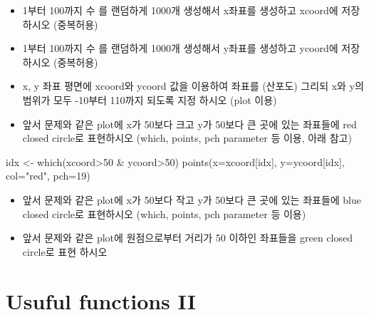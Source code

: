 \documentclass[
]{book}
\newenvironment{Shaded}{\begin{snugshade}}{\end{snugshade}}
\newcommand{\AttributeTok}[1]{\textcolor[rgb]{0.77,0.63,0.00}{#1}}
\newcommand{\DecValTok}[1]{\textcolor[rgb]{0.00,0.00,0.81}{#1}}
\newcommand{\FunctionTok}[1]{\textcolor[rgb]{0.00,0.00,0.00}{#1}}
\newcommand{\NormalTok}[1]{#1}
\newcommand{\OtherTok}[1]{\textcolor[rgb]{0.56,0.35,0.01}{#1}}
\newcommand{\SpecialCharTok}[1]{\textcolor[rgb]{0.00,0.00,0.00}{#1}}
\newcommand{\StringTok}[1]{\textcolor[rgb]{0.31,0.60,0.02}{#1}}
\providecommand{\tightlist}{%
  \setlength{\itemsep}{0pt}\setlength{\parskip}{0pt}}
\begin{document}
\begin{itemize}
\tightlist
\item
  1부터 100까지 수 를 랜덤하게 1000개 생성해서 x좌표를 생성하고 xcoord에 저장 하시오 (중복허용)
\item
  1부터 100까지 수 를 랜덤하게 1000개 생성해서 y좌표를 생성하고 ycoord에 저장 하시오 (중복허용)
\item
  x, y 좌표 평면에 xcoord와 ycoord 값을 이용하여 좌표를 (산포도) 그리되 x와 y의 범위가 모두 -10부터 110까지 되도록 지정 하시오 (plot 이용)
\item
  앞서 문제와 같은 plot에 x가 50보다 크고 y가 50보다 큰 곳에 있는 좌표들에 red closed circle로 표현하시오 (which, points, pch parameter 등 이용, 아래 참고)
\end{itemize}

\begin{Shaded}
\begin{Highlighting}[]
\NormalTok{idx }\OtherTok{\textless{}{-}} \FunctionTok{which}\NormalTok{(xcoord}\SpecialCharTok{\textgreater{}}\DecValTok{50} \SpecialCharTok{\&}\NormalTok{ ycoord}\SpecialCharTok{\textgreater{}}\DecValTok{50}\NormalTok{)}
\FunctionTok{points}\NormalTok{(}\AttributeTok{x=}\NormalTok{xcoord[idx], }\AttributeTok{y=}\NormalTok{ycoord[idx], }\AttributeTok{col=}\StringTok{"red"}\NormalTok{, }\AttributeTok{pch=}\DecValTok{19}\NormalTok{)}
\end{Highlighting}
\end{Shaded}

\begin{itemize}
\tightlist
\item
  앞서 문제와 같은 plot에 x가 50보다 작고 y가 50보다 큰 곳에 있는 좌표들에 blue closed circle로 표현하시오 (which, points, pch parameter 등 이용)
\item
  앞서 문제와 같은 plot에 원점으로부터 거리가 50 이하인 좌표들을 green closed circle로 표현 하시오
\end{itemize}

\hypertarget{usuful-functions-ii}{%
\section{Usuful functions II}\label{usuful-functions-ii}}
\end{document}
